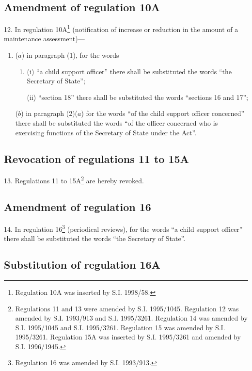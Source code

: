 \documentclass[12pt,a4paper]{article}
\begin{document}
\subsection[12. Amendment of regulation 10A]{Amendment of regulation 10A}

12.  In regulation 10A\footnote{\frenchspacing Regulation 10A was inserted by S.I. 1998/58.} (notification of increase or reduction in the amount of a maintenance assessment)---
\begin{enumerate}\item[]
($a$) in paragraph (1), for the words---
\begin{enumerate}\item[]
(i) “a child support officer” there shall be substituted the words “the Secretary of State”;

(ii) “section 18” there shall be substituted the words “sections 16 and 17”;
\end{enumerate}

($b$) in paragraph (2)($a$) for the words “of the child support officer concerned” there shall be substituted the words “of the officer concerned who is exercising functions of the Secretary of State under the Act”.
\end{enumerate}

\subsection[13. Revocation of regulations 11 to 15A]{Revocation of regulations 11 to 15A}

13.  Regulations 11 to 15A\footnote{\frenchspacing Regulations 11 and 13 were amended by S.I. 1995/1045. Regulation 12 was amended by S.I. 1993/913 and S.I. 1995/3261. Regulation 14 was amended by S.I. 1995/1045 and S.I. 1995/3261. Regulation 15 was amended by S.I. 1995/3261. Regulation 15A was inserted by S.I. 1995/3261 and amended by S.I. 1996/1945.} are hereby revoked.

\subsection[14. Amendment of regulation 16]{Amendment of regulation 16}

14.  In regulation 16\footnote{\frenchspacing Regulation 16 was amended by S.I. 1993/913.} (periodical reviews), for the words “a child support officer” there shall be substituted the words “the Secretary of State”.

\subsection[15. Substitution of regulation 16A]{Substitution of regulation 16A}
\end{document}
